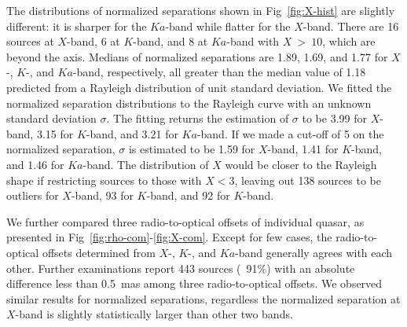 \documentclass{aa-note}   %
\begin{document}
The distributions of normalized separations shown in Fig~\ref{fig:X-hist} are slightly different: it is sharper for the $Ka$-band while flatter for the $X$-band.
There are 16 sources at $X$-band, 6 at $K$-band, and 8 at $Ka$-band with $X~>~10$, which are beyond the axis.
Medians of normalized separations are 1.89, 1.69, and 1.77 for $X$-, $K$-, and $Ka$-band, respectively, all greater than the median value of 1.18 predicted from a Rayleigh distribution of unit standard deviation.
We fitted the normalized separation distributions to the Rayleigh curve with an unknown standard deviation $\sigma$.
The fitting returns the estimation of $\sigma$ to be 3.99 for $X$-band, 3.15 for $K$-band, and 3.21 for $Ka$-band. 
If we made a cut-off of 5 on the normalized separation, $\sigma$ is estimated to be 1.59 for $X$-band, 1.41 for $K$-band, and 1.46 for $Ka$-band. 
The distribution of $X$ would be closer to the Rayleigh shape if restricting sources to those with $X<3$, leaving out 138 sources to be outliers for $X$-band, 93 for $K$-band, and 92 for $K$-band.

We further compared three radio-to-optical offsets of individual quasar, as presented in Fig~\ref{fig:rho-com}-\ref{fig:X-com}.
Except for few cases, the radio-to-optical offsets determined from $X$-, $K$-, and $Ka$-band generally agrees with each other.
Further examinations report 443 sources (~91\%) with an absolute difference less than 0.5~mas among three radio-to-optical offsets.
We observed similar results for normalized separations, regardless the normalized separation at $X$-band is slightly statistically larger than other two bands.
\end{document}
